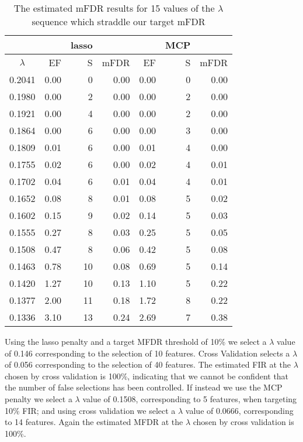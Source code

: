\begin{table}[ht]
\centering
\begin{tabular}{c|rrr|rrr}
  \hline
 & & lasso & & & MCP & \\
 \hline
$\lambda$ & EF & S & mFDR & EF & S & mFDR \\ 
  \hline
0.2041 & 0.00 &   0 & 0.00 & 0.00 &   0 & 0.00 \\ 
  0.1980 & 0.00 &   2 & 0.00 & 0.00 &   2 & 0.00 \\ 
  0.1921 & 0.00 &   4 & 0.00 & 0.00 &   2 & 0.00 \\ 
  0.1864 & 0.00 &   6 & 0.00 & 0.00 &   3 & 0.00 \\ 
  0.1809 & 0.01 &   6 & 0.00 & 0.01 &   4 & 0.00 \\ 
  0.1755 & 0.02 &   6 & 0.00 & 0.02 &   4 & 0.01 \\ 
  0.1702 & 0.04 &   6 & 0.01 & 0.04 &   4 & 0.01 \\ 
  0.1652 & 0.08 &   8 & 0.01 & 0.08 &   5 & 0.02 \\ 
  0.1602 & 0.15 &   9 & 0.02 & 0.14 &   5 & 0.03 \\ 
  0.1555 & 0.27 &   8 & 0.03 & 0.25 &   5 & 0.05 \\ 
  0.1508 & 0.47 &   8 & 0.06 & 0.42 &   5 & 0.08 \\ 
  0.1463 & 0.78 &  10 & 0.08 & 0.69 &   5 & 0.14 \\ 
  0.1420 & 1.27 &  10 & 0.13 & 1.10 &   5 & 0.22 \\ 
  0.1377 & 2.00 &  11 & 0.18 & 1.72 &   8 & 0.22 \\ 
  0.1336 & 3.10 &  13 & 0.24 & 2.69 &   7 & 0.38 \\ 
   \hline
\end{tabular}
 \caption{The estimated mFDR results for 15 values of the $\lambda$ sequence which straddle our target mFDR}
\end{table}

Using the lasso penalty and a target MFDR threshold of 10\% we select a $\lambda$ value of 0.146 corresponding to the selection of 10 features.  Cross Validation selects a $\lambda$ of 0.056 corresponding to the selection of 40 features.  The estimated FIR at the $\lambda$ chosen by cross validation is 100\%, indicating that we cannot be confident that the number of false selections has been controlled.  If instead we use the MCP penalty we select a $\lambda$ value of 0.1508, corresponding to 5 features, when targeting 10\% FIR; and using cross validation we select a $\lambda$ value of 0.0666, corresponding to 14 features.  Again the estimated MFDR at the $\lambda$ chosen by cross validation is 100\%.  

